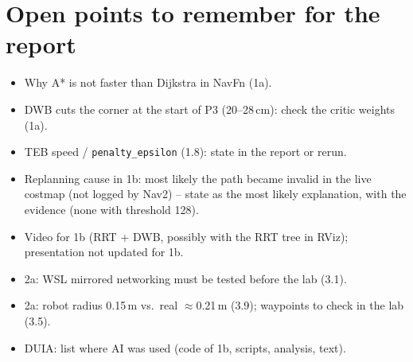 \documentclass[10pt]{article}
\newcommand{\pkg}[1]{\texttt{#1}}
\begin{document}
\section{Open points to remember for the report}

\begin{itemize}
  \item Why A* is not faster than Dijkstra in NavFn (1a).
  \item DWB cuts the corner at the start of P3 (20--28\,cm): check the critic weights (1a).
  \item TEB speed / \pkg{penalty\_epsilon} (1.8): state in the report or rerun.
  \item Replanning cause in 1b: most likely the path became invalid in the live costmap (not logged by Nav2) -- state as the most likely explanation, with the evidence (none with threshold 128).
  \item Video for 1b (RRT + DWB, possibly with the RRT tree in RViz); presentation not updated for 1b.
  \item 2a: WSL mirrored networking must be tested before the lab (3.1).
  \item 2a: robot radius 0.15\,m vs.\ real $\approx$0.21\,m (3.9); waypoints to check in the lab (3.5).
  \item DUIA: list where AI was used (code of 1b, scripts, analysis, text).
\end{itemize}
\end{document}
